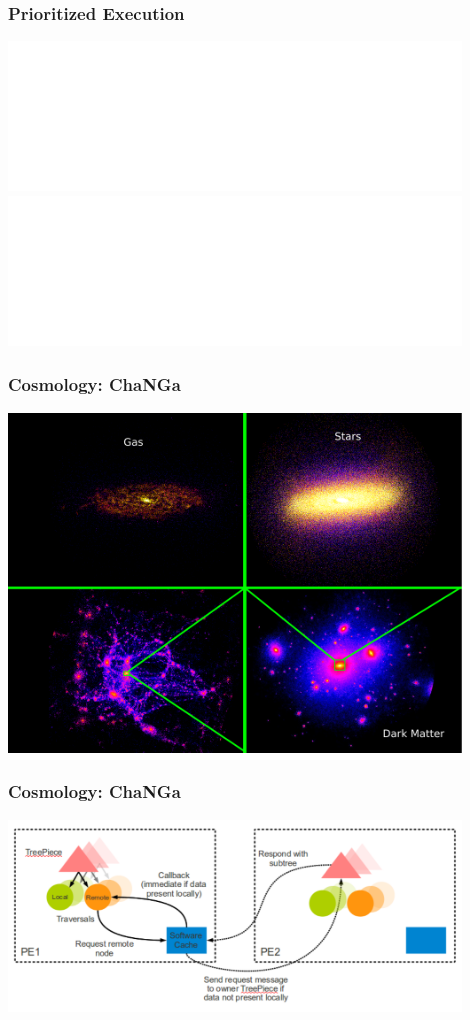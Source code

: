 \begin{frame}
\frametitle{Prioritized Execution}
	\begin{center}
        \includegraphics<1>[width=0.9\textwidth]{../figures/progmodel/16-scheduler.pdf}
        \includegraphics<2>[width=0.9\textwidth]{../figures/progmodel/17-prio-scheduling.pdf}
	\end{center}
\end{frame}



\begin{frame}
\frametitle{Cosmology: ChaNGa}
\begin{center}
\includegraphics[width=0.9\textwidth]{../figures/changa-length-scales.pdf}
\end{center}
\end{frame}


\begin{frame}
\frametitle{Cosmology: ChaNGa}
\begin{center}
\includegraphics[width=0.9\textwidth]{../figures/changa.pdf}
\end{center}
\end{frame}


